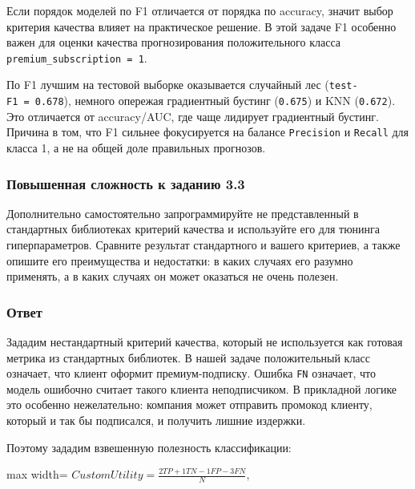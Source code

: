 \documentclass[11pt]{article}
\begin{document}
    Если порядок моделей по F1 отличается от порядка по accuracy, значит
выбор критерия качества влияет на практическое решение. В этой задаче F1
особенно важен для оценки качества прогнозирования положительного класса
\texttt{premium\_subscription\ =\ 1}.

По F1 лучшим на тестовой выборке оказывается случайный лес
(\texttt{test-F1\ =\ 0.678}), немного опережая градиентный бустинг
(\texttt{0.675}) и KNN (\texttt{0.672}). Это отличается от accuracy/AUC,
где чаще лидирует градиентный бустинг. Причина в том, что F1 сильнее
фокусируется на балансе \texttt{Precision} и \texttt{Recall} для класса
1, а не на общей доле правильных прогнозов.

    \subsubsection{Повышенная сложность к заданию
3.3}\label{ux43fux43eux432ux44bux448ux435ux43dux43dux430ux44f-ux441ux43bux43eux436ux43dux43eux441ux442ux44c-ux43a-ux437ux430ux434ux430ux43dux438ux44e-3.3}

Дополнительно самостоятельно запрограммируйте не представленный в
стандартных библиотеках критерий качества и используйте его для тюнинга
гиперпараметров. Сравните результат стандартного и вашего критериев, а
также опишите его преимущества и недостатки: в каких случаях его разумно
применять, а в каких случаях он может оказаться не очень полезен.

\subsubsection{Ответ}

Зададим нестандартный критерий качества, который не используется как
готовая метрика из стандартных библиотек. В нашей задаче положительный
класс означает, что клиент оформит премиум-подписку. Ошибка \texttt{FN}
означает, что модель ошибочно считает такого клиента неподписчиком. В
прикладной логике это особенно нежелательно: компания может отправить
промокод клиенту, который и так бы подписался, и получить лишние
издержки.

Поэтому зададим взвешенную полезность классификации:

\begin{center}
\begin{adjustbox}{max width=\linewidth}
\(\displaystyle CustomUtility = \frac{2TP + 1TN - 1FP - 3FN}{N},\)
\end{adjustbox}
\end{center}
\end{document}
